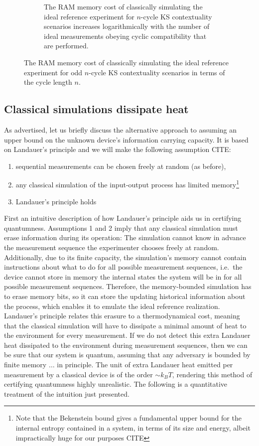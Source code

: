 \begin{figure}
\begin{subfigure}{\textwidth}
            \caption{The RAM memory cost of classically simulating the ideal reference experiment for $n$-cycle KS contextuality scenarios increases logarithmically with the number of ideal measurements obeying cyclic compatibility that are performed.}
        \end{subfigure}
        \caption{The RAM memory cost of classically simulating the ideal reference experiment for odd $n$-cycle KS contextuality scenarios in terms of the cycle length $n$.}
        \label{fig:ncycleRAM}
\end{figure}


\subsection{Classical simulations dissipate heat}
\label{sec:landauer}
As advertised, let us briefly discuss the alternative approach to assuming an upper bound on the unknown device's information carrying capacity. It is based on Landauer's principle and we will make the following assumption CITE:
\begin{enumerate}
    \item sequential measurements can be chosen freely at random (as before),
    \item any classical simulation of the input-output process has limited memory\footnote{Note that the Bekenstein bound gives a fundamental upper bound for the internal entropy contained in a system, in terms of its size and energy, albeit impractically huge for our purposes CITE}
    \item Landauer's principle holds
\end{enumerate}

First an intuitive description of how Landauer's principle aids us in certifying quantumness.
Assumptions 1 and 2 imply that any classical simulation must erase information during its operation: The simulation cannot know in advance the measurement sequence the experimenter chooses freely at random. Additionally, due to its finite capacity, the simulation's memory cannot contain instructions about what to do for all possible measurement sequences, i.e.\ the device cannot store in memory the internal states the system will be in for all possible measurement sequences. Therefore, the memory-bounded simulation has to erase memory bits, so it can store the updating historical information about the process, which enables it to emulate the ideal reference realization. Landauer's principle relates this erasure to a thermodynamical cost, meaning that the classical simulation will have to dissipate a minimal amount of heat to the environment for every measurement. If we do not detect this extra Landauer heat dissipated to the environment during measurement sequences, then we can be sure that our system is quantum, assuming that any adversary is bounded by finite memory $\dots$ in principle. The unit of extra Landauer heat emitted per measurement by a classical device is of the order $\sim k_B T$, rendering this method of certifying quantumness highly unrealistic. The following is a quantitative treatment of the intuition just presented.

